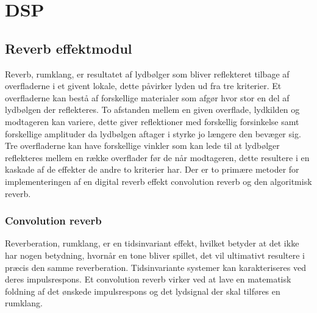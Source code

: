 \chapter{DSP}\label{chap:DSP}


\section{Reverb effektmodul}\label{sec:reverb}
Reverb, rumklang, er resultatet af lydbølger som bliver reflekteret tilbage af %
overfladerne i et givent lokale, dette påvirker lyden ud fra tre kriterier.\newline 
Et overfladerne kan bestå af forskellige materialer som afgør hvor stor en del af lydbølgen der reflekteres.\newline 
To afstanden mellem en given overflade, lydkilden og modtageren kan variere, dette giver reflektioner med forskellig forsinkelse samt forskellige amplituder da lydbølgen aftager i styrke jo længere den bevæger sig.\newline 
Tre overfladerne kan have forskellige vinkler som kan lede til at lydbølger reflekteres mellem en række overflader før de når modtageren, dette resultere i en kaskade af de effekter de andre to kriterier har.\newline
Der er to primære metoder for implementeringen af en digital reverb effekt convolution reverb og den algoritmisk reverb.
\subsection{Convolution reverb}
Reverberation, rumklang, er en tidsinvariant effekt, hvilket betyder at det ikke har nogen betydning, hvornår en tone bliver spillet, det vil ultimativt resultere i præcis den samme reverberation. \newline
Tidsinvariante systemer kan karakteriseres ved deres impulsrespons.
Et convolution reverb virker ved at lave en matematisk foldning af det ønskede %
impulsrespons og det lydsignal der skal tilføres en rumklang.\newline 

